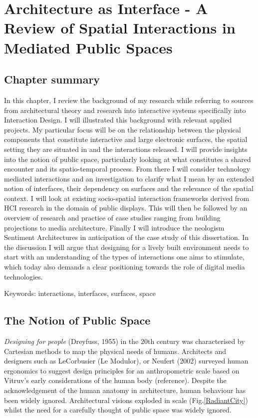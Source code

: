 \chapter{Architecture as Interface - A Review of Spatial Interactions in Mediated Public Spaces}
\label{chapterlabel3}


\section*{Chapter summary}

In this chapter, I review the background of my research while referring to sources from architectural theory and research into interactive systems specifically into Interaction Design. I will illustrated this background with relevant applied projects. My particular focus will be on the relationship between the physical components that constitute interactive and large electronic surfaces, the spatial setting they are situated in and the interactions released. I will provide insights into the notion of public space, particularly looking at what constitutes a shared encounter and its spatio-temporal process. From there I will consider technology mediated interactions and an investigation to clarify what I mean by an extended notion of interfaces, their dependency on surfaces and the relevance of the spatial context. I will look at existing socio-spatial interaction frameworks derived from HCI research in the domain of public displays. This will then be followed by an overview of research and practice of case studies ranging from building projections to media architecture. Finally I will introduce the neologism Sentiment Architectures in anticipation of the case study of this dissertation. In the discussion I will argue that designing for a lively built environment needs to start with an understanding of the types of interactions one aims to stimulate, which today also demands a clear positioning towards the role of digital media technologies.  

Keywords: interactions, interfaces, surfaces, space

\newpage




\section{The Notion of Public Space}

\textit{Designing for people} (Dreyfuss, 1955) in the 20th century was characterised by Cartesian methods to map the physical needs of humans. Architects and designers such as LeCorbusier (Le Modulor), or Neufert (2002) surveyed human ergonomics to suggest design principles for an anthropometric scale based on Vitruv's early considerations of the human body (reference). Despite the acknowledgement of the human anatomy in architecture, human behaviour has been widely ignored. Architectural visions exploded in scale (Fig.\ref{RadiantCity}) whilst the need for a carefully thought of public space was widely ignored.

